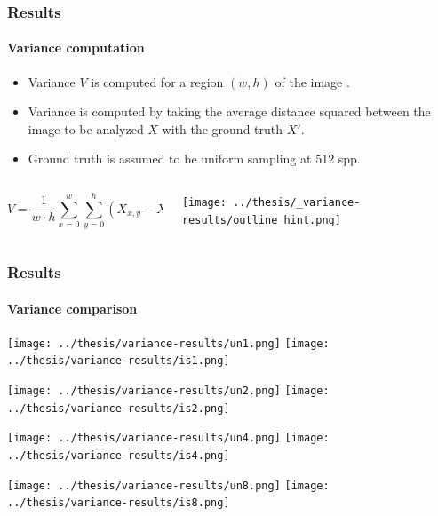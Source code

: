 \documentclass{beamer}
\begin{document}
   
   \begin{frame}
    \frametitle{Results}
    \framesubtitle{Variance computation}

	\begin{itemize}
    \item Variance $V$ is computed for a region $(w,h)$ of the image .
	\item Variance is computed by taking the average distance squared between the image to be analyzed $X$ with the ground truth $X'$.
	\item Ground truth is assumed to be uniform sampling at 512 spp.
	\end{itemize}
	
	\begin{columns}
    \begin{column}{0.65\textwidth}
	\begin{equation}
	V = \frac{1}{w\cdot h} \sum_{x=0}^w \sum_{y=0}^h (X_{x,y} - X'_{x,y})^2
	\end{equation}		
	\end{column}
	\begin{column}{0.35\textwidth}
	\texttt{[image: ../thesis/\_variance-results/outline\_hint.png]}
	\end{column}
	\end{columns}
    
    \end{frame}
  
  
  
  \begin{frame}
    \frametitle{Results}
    \framesubtitle{Variance comparison}
    \centering
    
    \texttt{[image: ../thesis/variance-results/un1.png]} 
    \texttt{[image: ../thesis/variance-results/is1.png]}
    
    \texttt{[image: ../thesis/variance-results/un2.png]} 
    \texttt{[image: ../thesis/variance-results/is2.png]}
    
    \texttt{[image: ../thesis/variance-results/un4.png]} 
    \texttt{[image: ../thesis/variance-results/is4.png]}
    
    \texttt{[image: ../thesis/variance-results/un8.png]} 
    \texttt{[image: ../thesis/variance-results/is8.png]}
   

  \end{frame}
  
\end{document}
